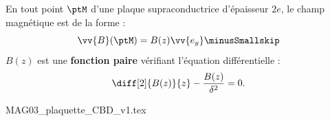\hauteurLargeurCadreReponse		{7mm}{6cm}
\initialisationEntrainement

\debutEntrainement

                                \initialisationPartieGauche %
En tout point $\ptM$ d'une plaque supraconductrice d'épaisseur $2e$, le champ magnétique est de la forme : \minusSmallskip
\[
\vv{B}(\ptM)=B(z)\vv{e_y} \minusSmallskip
\]
$B(z)$ est une \textbf{fonction paire} vérifiant  l'équation différentielle : \minusSmallskip
\[
\diff[2]{B(z)}{z}-\dfrac{B(z)}{\delta^2} = 0.
\]

                                \initialisationPartieDroite %
\begin{center}
{MAG03_plaquette_CBD_v1.tex}
\end{center}
%
                               \finalisationDuPartageDePage %

